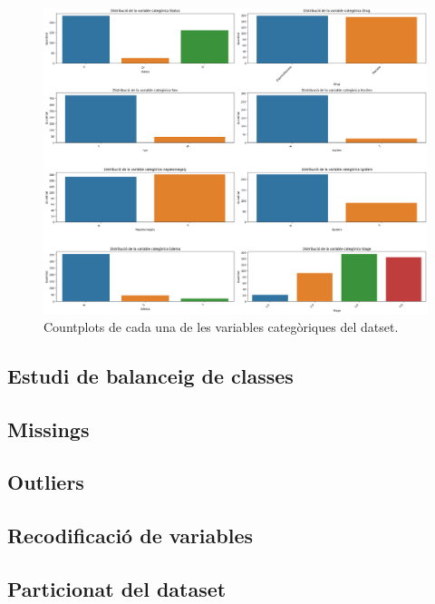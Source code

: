 \begin{figure}
    \centering
    \includegraphics[width=\linewidth]{img/cat-countplots.png}
    \caption{Countplots de cada una de les variables categòriques del datset.}
    \label{fig:cat-countplots-1}
\end{figure}

\subsection{Estudi de balanceig de classes}

\subsection{Missings}

\subsection{Outliers}

\subsection{Recodificació de variables}

\subsection{Particionat del dataset}
